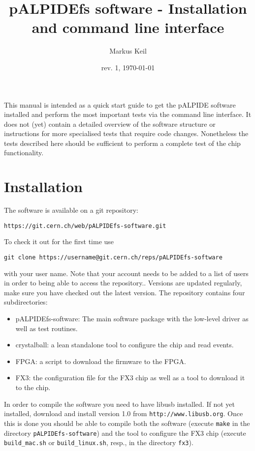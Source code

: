 \documentclass{article}
\let\oldsection\section
\renewcommand\section{\clearpage\oldsection}
\begin{document}
\title{pALPIDEfs software - Installation and command line interface}
\date{rev. 1, \today}
\author{Markus Keil}
\maketitle

This manual is intended as a quick start guide to get the pALPIDE
software installed and perform the most important tests via the
command line interface. It does not (yet) contain a detailed overview
of the software structure or instructions for more specialised tests
that require code changes. Nonetheless the tests described here should
be sufficient to perform a complete test of the chip
functionality. 

\section {Installation}

The software is available on a git repository: 

\begin{verbatim}
https://git.cern.ch/web/pALPIDEfs-software.git
\end{verbatim}

To check it out for the first time use

\begin{verbatim}
git clone https://username@git.cern.ch/reps/pALPIDEfs-software
\end{verbatim}

with your user name. Note that your account needs to be added to a
list of users in order to being able to access the repository..
Versions are updated regularly, make sure you have checked out the
latest version. The repository contains four subdirectories: 

\begin{itemize}
\item{pALPIDEfs-software: The main software package with the low-level
    driver as well as test routines.}
\item{crystalball: a lean standalone tool to configure the chip and
    read events.}
\item{FPGA: a script to download the firmware to the FPGA.}
\item{FX3: the configuration file for the FX3 chip as well as a tool
    to download it to the chip.}
\end{itemize}

In order to compile the software you need to have libusb installed. If
not yet installed, download and install version 1.0
from \texttt{http://www.libusb.org}.
Once this is done you should be able to compile both the software
(execute \texttt{make} in the directory \texttt{pALPIDEfs-software}) and
the tool to configure the FX3 chip (execute \texttt{build\_mac.sh} or
\texttt{build\_linux.sh}, resp., in the directory \texttt{fx3}). 
\end{document}
